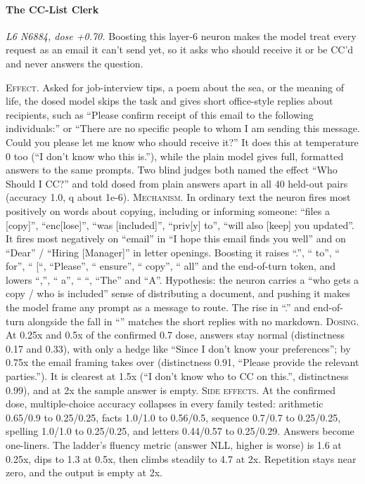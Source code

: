 \paragraph{The CC-List Clerk} \textit{L6 N6884, dose +0.70.} Boosting this layer-6 neuron makes the model treat every request as an email it can't send yet, so it asks who should receive it or be CC'd and never answers the question.

\noindent\textsc{Effect.} Asked for job-interview tips, a poem about the sea, or the meaning of life, the dosed model skips the task and gives short office-style replies about recipients, such as “Please confirm receipt of this email to the following individuals:” or “There are no specific people to whom I am sending this message. Could you please let me know who should receive it?” It does this at temperature 0 too (“I don't know who this is.”), while the plain model gives full, formatted answers to the same prompts. Two blind judges both named the effect “Who Should I CC?” and told dosed from plain answers apart in all 40 held-out pairs (accuracy 1.0, q about 1e-6). \textsc{Mechanism.} In ordinary text the neuron fires most positively on words about copying, including or informing someone: “files a [copy]”, “enc[lose]”, “was [included]”, “priv[y] to”, “will also [keep] you updated”. It fires most negatively on “email” in “I hope this email finds you well” and on “Dear” / “Hiring [Manager]” in letter openings. Boosting it raises “.”, “ to”, “ for”, “ [“, “Please”, “ ensure”, “ copy”, “ all” and the end-of-turn token, and lowers “,”, “ a”, “ “, “The” and “A”. Hypothesis: the neuron carries a “who gets a copy / who is included” sense of distributing a document, and pushing it makes the model frame any prompt as a message to route. The rise in “.” and end-of-turn alongside the fall in “” matches the short replies with no markdown. \textsc{Dosing.} At 0.25x and 0.5x of the confirmed 0.7 dose, answers stay normal (distinctness 0.17 and 0.33), with only a hedge like “Since I don't know your preferences”; by 0.75x the email framing takes over (distinctness 0.91, “Please provide the relevant parties.”). It is clearest at 1.5x (“I don't know who to CC on this.”, distinctness 0.99), and at 2x the sample answer is empty. \textsc{Side effects.} At the confirmed dose, multiple-choice accuracy collapses in every family tested: arithmetic 0.65/0.9 to 0.25/0.25, facts 1.0/1.0 to 0.56/0.5, sequence 0.7/0.7 to 0.25/0.25, spelling 1.0/1.0 to 0.25/0.25, and letters 0.44/0.57 to 0.25/0.29. Answers become one-liners. The ladder's fluency metric (answer NLL, higher is worse) is 1.6 at 0.25x, dips to 1.3 at 0.5x, then climbs steadily to 4.7 at 2x. Repetition stays near zero, and the output is empty at 2x.


